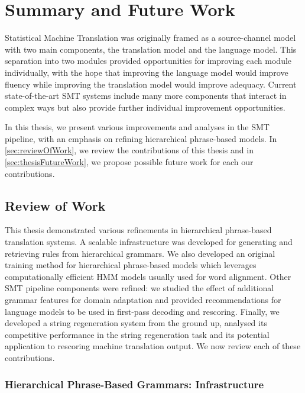 \chapter{Summary and Future Work}


Statistical Machine Translation was originally framed as a source-channel
model with two main components, the translation model and the
language model. This separation into two modules provided opportunities
for improving each module individually, with the hope that improving the language model
would improve fluency while improving the translation model would improve
adequacy. Current state-of-the-art SMT systems include many more components
that interact in complex ways but also provide further individual improvement
opportunities.

In this thesis, we present various improvements and analyses in the
SMT pipeline, with an emphasis on refining hierarchical phrase-based
models. In \autoref{sec:reviewOfWork}, we review the contributions of
this thesis and in \autoref{sec:thesisFutureWork}, we propose
possible future work for each our contributions.

\section{Review of Work}
\label{sec:reviewOfWork}

This thesis demonstrated various refinements in
hierarchical phrase-based translation systems.
A scalable infrastructure was developed for generating
and retrieving rules from hierarchical grammars. We also
developed an original training method for hierarchical
phrase-based models which leverages computationally
efficient HMM models usually used for word
alignment. Other SMT pipeline components
were refined: we studied the effect of additional
grammar features for domain adaptation and provided recommendations
for language models to be used in first-pass decoding and rescoring.
Finally, we developed a string regeneration system from the
ground up, analysed its competitive performance in
the string regeneration task and its potential application to
rescoring machine translation output. We now review each of
these contributions.

\subsection{Hierarchical Phrase-Based Grammars: Infrastructure}

